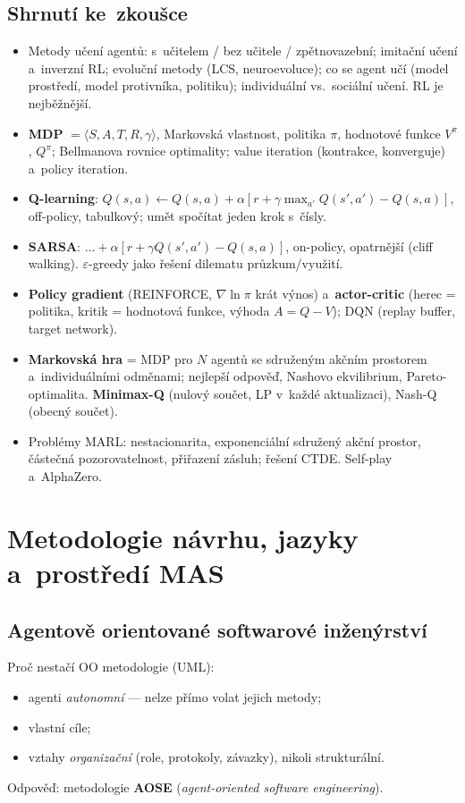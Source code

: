 \documentclass[11pt,a4paper]{article}
\theoremstyle{definition}
\begin{document}
\subsection{Shrnutí ke~zkoušce}

\begin{itemize}
\item Metody učení agentů: s~učitelem / bez učitele / zpětnovazební; imitační učení
  a~inverzní RL; evoluční metody (LCS, neuroevoluce); co se agent učí (model prostředí,
  model protivníka, politiku); individuální vs.\ sociální učení. RL je nejběžnější.
\item \textbf{MDP} $= \langle S,A,T,R,\gamma\rangle$, Markovská vlastnost, politika $\pi$,
  hodnotové funkce $V^\pi$, $Q^\pi$; Bellmanova rovnice optimality; value iteration
  (kontrakce, konverguje) a~policy iteration.
\item \textbf{Q-learning}: $Q(s,a) \leftarrow Q(s,a) + \alpha[r + \gamma\max_{a'}Q(s',a') - Q(s,a)]$,
  off-policy, tabulkový; umět spočítat jeden krok s~čísly.
\item \textbf{SARSA}: $\dots + \alpha[r + \gamma Q(s',a') - Q(s,a)]$, on-policy, opatrnější
  (cliff walking). $\varepsilon$-greedy jako řešení dilematu průzkum/využití.
\item \textbf{Policy gradient} (REINFORCE, $\nabla \ln \pi$ krát výnos) a~\textbf{actor-critic}
  (herec = politika, kritik = hodnotová funkce, výhoda $A = Q - V$); DQN (replay buffer,
  target network).
\item \textbf{Markovská hra} = MDP pro $N$ agentů se sdruženým akčním prostorem
  a~individuálními odměnami; nejlepší odpověď, Nashovo ekvilibrium, Pareto-optimalita.
  \textbf{Minimax-Q} (nulový součet, LP v~každé aktualizaci), Nash-Q (obecný součet).
\item Problémy MARL: nestacionarita, exponenciální sdružený akční prostor, částečná
  pozorovatelnost, přiřazení zásluh; řešení CTDE. Self-play a~AlphaZero.
\end{itemize}

\section{Metodologie návrhu, jazyky a~prostředí MAS}
\label{sec:metodologie}

\subsection{Agentově orientované softwarové inženýrství}
Proč nestačí OO metodologie (UML):
\begin{itemize}
\item agenti \emph{autonomní} --- nelze přímo volat jejich metody;
\item vlastní cíle;
\item vztahy \emph{organizační} (role, protokoly, závazky), nikoli strukturální.
\end{itemize}
Odpověď: metodologie \textbf{AOSE} (\emph{agent-oriented software engineering}).
\end{document}
